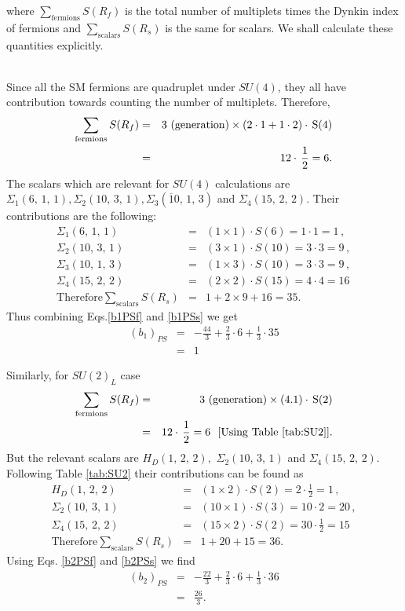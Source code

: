 \documentclass[11pt,prd,superscriptaddress,nofootinbib]{revtex4-1}
\def\sbar{\overline}
\numberwithin{equation}{section}
\newcommand{\bea}{\begin{eqnarray}}
\newcommand{\eea}{\end{eqnarray}}
\begin{document}
\vspace{0.8cm}
\noindent
where $\sum_{\mathrm{fermions}}S(R_f)$ is the total number of multiplets times the Dynkin index of fermions and $\sum_{\mathrm{scalars}}S(R_s)$ is the same for scalars. We shall calculate these quantities explicitly.

\noindent
\\
Since all the SM fermions are quadruplet under $SU(4)$, they all have contribution towards counting the number of multiplets. Therefore, 
\bea
\label{b1PSf}
\sum_{\mathrm{fermions}}S(R_f)&=& 3~(\rm generation)\times  (2\cdot 1+1\cdot 2)\cdot\,S(4)\nonumber\\
&=&12\cdot\,\frac{1}{2}=6.
\eea
The scalars which are relevant for $SU(4)$ calculations are $\Sigma_1(6,\,1,\,1), \Sigma_2(10,\,3,\,1), \Sigma_3(\sbar 10,\,1,\,3)$ and $\Sigma_4(15,\,2,\,2)$. Their contributions are the following:
\bea
\label{b1PSs}
\Sigma_1(6,\,1,\,1) &=& (1\times 1)\cdot S(6) = 1\cdot 1 = 1\,,\nonumber\\
\Sigma_2(10,\,3,\,1) &=& (3\times 1)\cdot S(10) = 3\cdot 3 = 9\,,\nonumber\\
\Sigma_3(10,\,1,\,3) &=& (1\times 3)\cdot S(10) = 3\cdot 3 = 9\,,\nonumber\\
\Sigma_4(15,\,2,\,2) &=& (2\times 2)\cdot S(15) = 4\cdot 4 = 16\,\nonumber\\
\mathrm{Therefore} \sum_{\mathrm{scalars}}S(R_s)&=& 1+2\times 9+16=35.
\eea
Thus combining Eqs.\ref{b1PSf} and \ref{b1PSs} we get 
\bea
\label{b1PSfinal}
(b_1)_{PS} &=& -\frac{44}{3}+\frac{2}{3}\cdot 6+\frac{1}{3}\cdot 35\nonumber\\
&=& \boxed{1}
\eea

\noindent
Similarly, for $SU(2)_L$ case
\bea
\label{b2PSf}
\sum_{\mathrm{fermions}}S(R_f)&=& 3~(\rm generation)\times  (4.1)\cdot\,S(2)\nonumber\\
&=&12\cdot\,\frac{1}{2}=6 ~~[\rm Using~Table~\ref{tab:SU2}].
\eea
But the relevant scalars are $H_D(1,\,2,\,2),$ $\Sigma_2(10,\,3,\,1)$ and $\Sigma_4(15,\,2,\,2)$. Following Table \ref{tab:SU2} their contributions can be found as
\bea
\label{b2PSs}
H_D(1,\,2,\,2) &=& (1\times 2)\cdot S(2) = 2\cdot\frac{1}{2} = 1\,,\nonumber\\
\Sigma_2(10,\,3,\,1) &=& (10\times 1)\cdot S(3) = 10\cdot 2 = 20\,,\nonumber\\
\Sigma_4(15,\,2,\,2) &=& (15\times 2)\cdot S(2) = 30\cdot\frac{1}{2} = 15\,\nonumber\\
\mathrm{Therefore} \sum_{\mathrm{scalars}}S(R_s)&=& 1+20+15=36.
\eea
Using Eqs. \ref{b2PSf} and \ref{b2PSs} we find
\bea
\label{b2PS}
(b_2)_{PS} &=&-\frac{22}{3}+\frac{2}{3}\cdot 6+\frac{1}{3}\cdot 36\nonumber\\
&=& \boxed{\frac{26}{3}}.
\eea 
\end{document}
